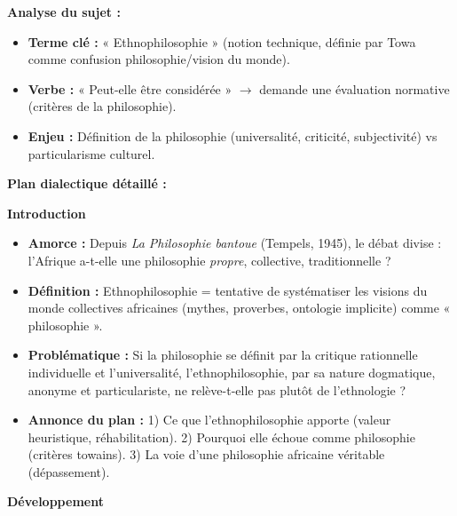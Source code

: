 \documentclass[11pt]{article}
\begin{document}
\begin{exoresolu}
\textbf{Analyse du sujet :}
\begin{itemize}
    \item \textbf{Terme clé :} « Ethnophilosophie » (notion technique, définie par Towa comme confusion philosophie/vision du monde).
    \item \textbf{Verbe :} « Peut-elle être considérée » $\rightarrow$ demande une évaluation normative (critères de la philosophie).
    \item \textbf{Enjeu :} Définition de la philosophie (universalité, criticité, subjectivité) vs particularisme culturel.
\end{itemize}

\textbf{Plan dialectique détaillé :}

\textbf{Introduction}
\begin{itemize}
    \item \textbf{Amorce :} Depuis \emph{La Philosophie bantoue} (Tempels, 1945), le débat divise : l'Afrique a-t-elle une philosophie \emph{propre}, collective, traditionnelle ?
    \item \textbf{Définition :} Ethnophilosophie = tentative de systématiser les visions du monde collectives africaines (mythes, proverbes, ontologie implicite) comme « philosophie ».
    \item \textbf{Problématique :} Si la philosophie se définit par la critique rationnelle individuelle et l'universalité, l'ethnophilosophie, par sa nature dogmatique, anonyme et particulariste, ne relève-t-elle pas plutôt de l'ethnologie ?
    \item \textbf{Annonce du plan :} 1) Ce que l'ethnophilosophie apporte (valeur heuristique, réhabilitation). 2) Pourquoi elle échoue comme philosophie (critères towains). 3) La voie d'une philosophie africaine véritable (dépassement).
\end{itemize}

\textbf{Développement}


\end{exoresolu}
\end{document}
